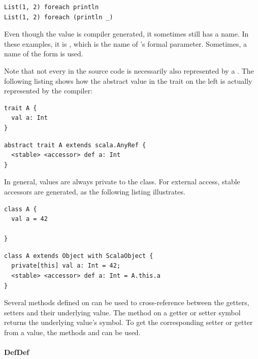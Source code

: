 \begin{lstlisting}
List(1, 2) foreach println
List(1, 2) foreach (println _)
\end{lstlisting}

Even though the value is compiler generated, it sometimes still has a name. In these examples, it is , which is the name of 's formal parameter. Sometimes, a name of the form  is used.

Note that not every  in the source code is necessarily also represented by a . The following listing shows how the abstract value in the trait on the left is actually represented by the compiler:

\begin{multicols}{2}
\begin{lstlisting}
trait A {
  val a: Int
}
\end{lstlisting}
\begin{lstlisting}
abstract trait A extends scala.AnyRef {
  <stable> <accessor> def a: Int
}
\end{lstlisting}
\end{multicols}

In general, values are always private to the class. For external access, stable accessors are generated, as the following listing illustrates.

\begin{multicols}{2}
\begin{lstlisting}
class A {
  val a = 42

}
\end{lstlisting}
\begin{lstlisting}
class A extends Object with ScalaObject {
  private[this] val a: Int = 42;
  <stable> <accessor> def a: Int = A.this.a
}
\end{lstlisting}
\end{multicols}

Several methods defined on  can be used to cross-reference between the getters, setters and their underlying value. The  method on a getter or setter symbol returns the underlying value's symbol. To get the corresponding setter or getter from a value, the methods  and  can be used.

\paragraph{DefDef} 

